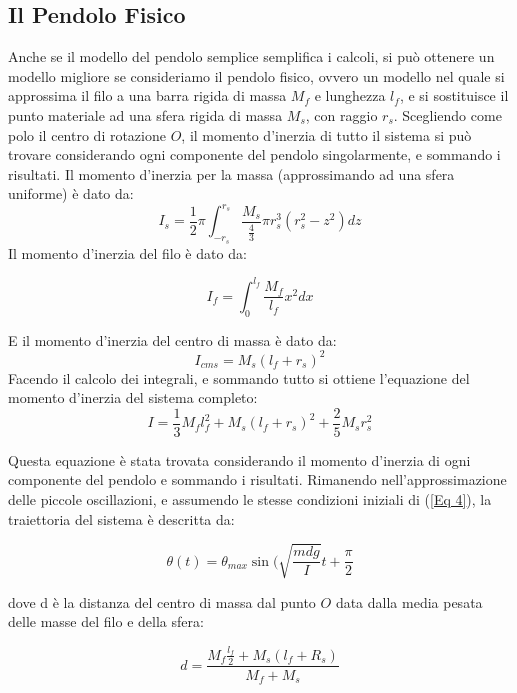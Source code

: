 \documentclass[a4paper]{article}
\begin{document}
\subsection{Il Pendolo Fisico}
Anche se il modello del pendolo semplice semplifica i calcoli, si può ottenere un modello migliore se consideriamo il pendolo fisico, ovvero un modello nel quale si approssima il filo a una barra rigida di massa $M_{f}$ e lunghezza $l_f$, e si sostituisce il punto materiale ad una sfera rigida di massa $M_{s}$, con raggio $r_s$. Scegliendo come polo il centro di rotazione $O$, il momento d'inerzia di tutto il sistema si può trovare considerando ogni componente del pendolo singolarmente, e sommando i risultati. Il momento d'inerzia per la massa (approssimando ad una sfera uniforme) è dato da:
\begin{equation}
    I_s = \frac{1}{2}\pi\int_{-r_s}^{r_s}{\frac{M_s}{\frac{4}{3}}\pi r^3_s}(r_s^2 - z^2)dz 
\end{equation}
Il momento d'inerzia del filo è dato da:

\begin{equation}
    I_f = \int_0^{l_f}{\frac{M_f}{l_f}x^2 dx}
\end{equation}

E il momento d'inerzia del centro di massa è dato da:
\begin{equation}
    I_{cms} = M_s({l_f}+r_s)^2
\end{equation}
Facendo il calcolo dei integrali, e sommando tutto si ottiene l'equazione del momento d'inerzia del sistema completo:
\begin{equation} \label{Eq 7}
    I = \frac{1}{3}M_f l^2_f +M_s(l_f+r_s)^2+\frac{2}{5}M_sr^2_s
\end{equation}

Questa equazione è stata trovata considerando il momento d'inerzia di ogni componente del pendolo e sommando i risultati. 
Rimanendo nell'approssimazione delle piccole oscillazioni, e assumendo le stesse condizioni iniziali di (\ref{Eq 4}), la traiettoria del sistema è descritta da:

\begin{equation} \label{Eq 8}
    \theta(t) = \theta_{max} \sin(\sqrt{\frac{mdg}{I}}t + \frac{\pi}{2}
\end{equation}

dove d è la distanza del centro di massa dal punto $O$ data dalla media pesata delle masse del filo e della sfera:

\begin{equation} \label{Eq 9}
    d = \frac{M_f\frac{l_f}{2} +M_s (l_f+R_s)}{M_f+M_s}
\end{equation}
\end{document}
